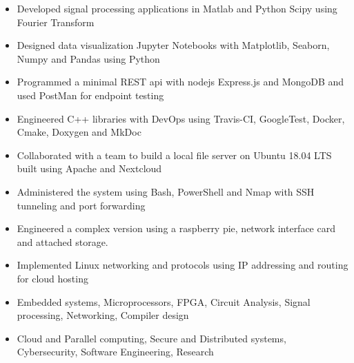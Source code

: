 \documentclass[11pt,a4paper,ragged2e]{altacv}
\begin{document}
\begin{paracol}{1}

\begin{itemize}
\item Developed signal processing applications in Matlab and Python Scipy using Fourier Transform 
\item Designed data visualization Jupyter Notebooks with Matplotlib, Seaborn, Numpy and Pandas using Python
\item Programmed a minimal REST api with nodejs Express.js and MongoDB and used PostMan for endpoint testing
\item Engineered C++ libraries with DevOps using Travis-CI, GoogleTest, Docker, Cmake, Doxygen and MkDoc
\end{itemize}
\tightdivider

\begin{itemize}
\item Collaborated with a team to build a local file server on Ubuntu 18.04 LTS built using Apache and Nextcloud
\item Administered the system using Bash, PowerShell and Nmap with SSH tunneling and port forwarding
\item Engineered a complex version using a raspberry pie, network interface card and attached storage.
\item Implemented Linux networking and protocols using IP addressing and routing for cloud hosting
\end{itemize}

\medskip

\begin{itemize} 
\item Embedded systems, Microprocessors, FPGA, Circuit Analysis, Signal processing, Networking,  Compiler design
\item Cloud and Parallel computing, Secure and Distributed systems, Cybersecurity, Software Engineering, Research
\end{itemize}



\end{paracol}
\end{document}
